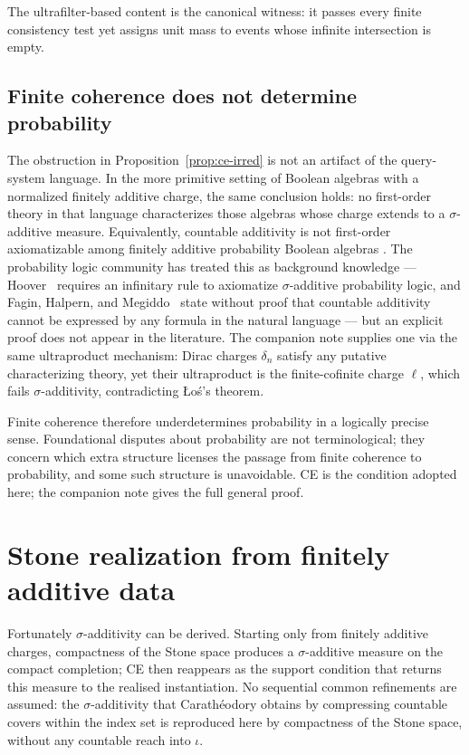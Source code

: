 \noindent The ultrafilter-based content is the canonical witness: it passes every
finite consistency test yet assigns unit mass to events whose infinite intersection is empty. 

\subsection{Finite coherence does not determine probability}
\label{sec:metatheorem}

The obstruction in Proposition~\ref{prop:ce-irred} is not an artifact of the query-system language.  In the more primitive setting of Boolean algebras with a normalized finitely additive charge, the same conclusion holds: no first-order theory in that language characterizes those algebras whose charge extends to a $\sigma$-additive measure.  Equivalently, countable additivity is not first-order axiomatizable among finitely additive probability Boolean algebras
\cite{MahonCE2026}.  The probability logic community has treated this as background knowledge --- Hoover~\cite{Hoover1978} requires an infinitary rule to axiomatize $\sigma$-additive probability logic, and Fagin, Halpern, and Megiddo~\cite{FaginHalpernMegiddo1990} state without proof that countable additivity cannot be expressed by any formula in the natural language --- but an explicit proof does not appear in the literature.  The companion note supplies one via the same ultraproduct mechanism: Dirac charges $\delta_n$ satisfy any putative characterizing theory, yet their ultraproduct is the finite-cofinite charge $\ell$, which fails $\sigma$-additivity, contradicting \L{}o\'{s}'s theorem.

Finite coherence therefore underdetermines probability in a logically precise sense.  Foundational disputes about probability are not terminological; they concern which extra structure licenses the passage from finite coherence to probability, and some such structure is unavoidable.  CE is the condition adopted here; the companion note \cite{MahonCE2026} gives the full general proof.


\section{Stone realization from finitely additive data}
\label{sec:stone}

Fortunately $\sigma$-additivity can be derived.  Starting only from finitely additive charges, compactness of the Stone space produces a $\sigma$-additive measure on the compact completion; CE then reappears as the support condition that returns this measure to the realised instantiation. No sequential common refinements are assumed: the $\sigma$-additivity that Carathéodory obtains by compressing countable covers within the index set is reproduced here by compactness of the Stone space, without any countable reach into $\iota$.

